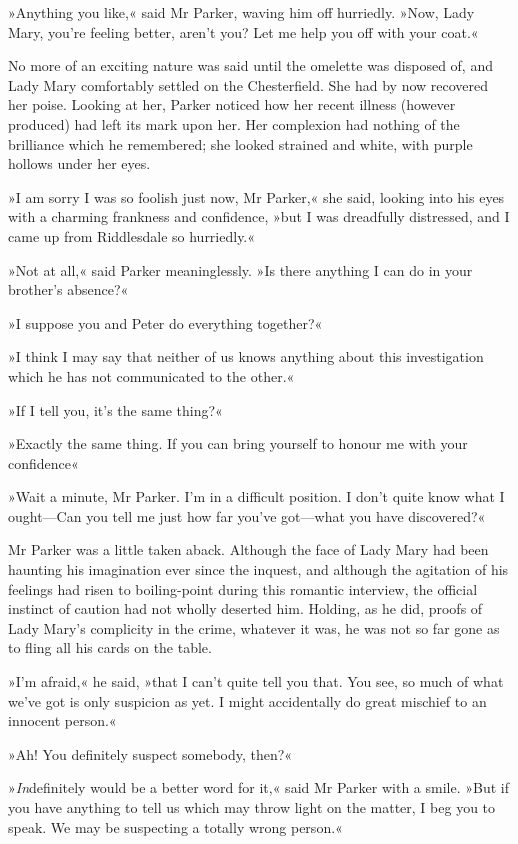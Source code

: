 »Anything you like,« said Mr Parker, waving him off hurriedly. »Now, Lady Mary, you're feeling better, aren't you? Let me help you off with your coat.«

No more of an exciting nature was said until the omelette was disposed of, and Lady Mary comfortably settled on the Chesterfield. She had by now recovered her poise. Looking at her, Parker noticed how her recent illness (however produced) had left its mark upon her. Her complexion had nothing of the brilliance which he remembered; she looked strained and white, with purple hollows under her eyes.

»I am sorry I was so foolish just now, Mr Parker,« she said, looking into his eyes with a charming frankness and confidence, »but I was dreadfully distressed, and I came up from Riddlesdale so hurriedly.«

»Not at all,« said Parker meaninglessly. »Is there anything I can do in your brother's absence?«

»I suppose you and Peter do everything together?«

»I think I may say that neither of us knows anything about this investigation which he has not communicated to the other.«

»If I tell you, it's the same thing?«

»Exactly the same thing. If you can bring yourself to honour me with your confidence\longdash«

»Wait a minute, Mr Parker. I'm in a difficult position. I don't quite know what I ought\allowbreak---\allowbreak Can you tell me just how far you've got\allowbreak---\allowbreak what you have discovered?«

Mr Parker was a little taken aback. Although the face of Lady Mary had been haunting his imagination ever since the inquest, and although the agitation of his feelings had risen to boiling-point during this romantic interview, the official instinct of caution had not wholly deserted him. Holding, as he did, proofs of Lady Mary's complicity in the crime, whatever it was, he was not so far gone as to fling all his cards on the table.

»I'm afraid,« he said, »that I can't quite tell you that. You see, so much of what we've got is only suspicion as yet. I might accidentally do great mischief to an innocent person.«

»Ah! You definitely suspect somebody, then?«

»\textit{In}definitely would be a better word for it,« said Mr Parker with a smile. »But if you have anything to tell us which may throw light on the matter, I beg you to speak. We may be suspecting a totally wrong person.«


